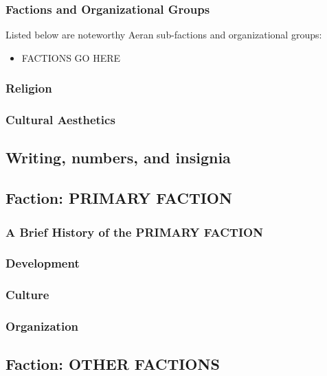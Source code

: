 \subsubsection{Factions and Organizational Groups}
Listed below are noteworthy Aeran sub-factions and organizational groups: 
\begin{itemize}
\item FACTIONS GO HERE
\end{itemize}

\subsubsection{Religion}

\subsubsection{Cultural Aesthetics}

\subsection{Writing, numbers, and insignia}

\subsection{Faction: PRIMARY FACTION}



\subsubsection{A Brief History of the PRIMARY FACTION}


\subsubsection{Development}

\subsubsection{Culture}

\subsubsection{Organization}

\subsection{Faction: OTHER FACTIONS}

